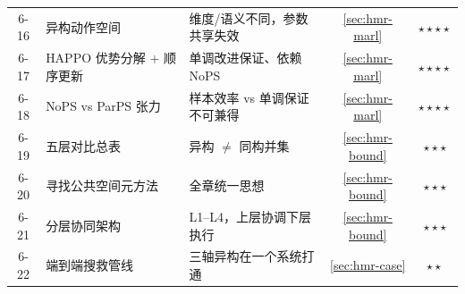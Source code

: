 \begin{table}[H]
\begin{tabular}{clp{5.4cm}cc}
6-16 & 异构动作空间 & 维度/语义不同，参数共享失效 & \cref{sec:hmr-marl} & $\star\star\star\star$ \\
6-17 & HAPPO 优势分解 $+$ 顺序更新 & 单调改进保证、依赖 NoPS & \cref{sec:hmr-marl} & $\star\star\star\star$ \\
6-18 & NoPS vs ParPS 张力 & 样本效率 vs 单调保证不可兼得 & \cref{sec:hmr-marl} & $\star\star\star\star$ \\
6-19 & 五层对比总表 & 异构 $\ne$ 同构并集 & \cref{sec:hmr-bound} & $\star\star\star$ \\
6-20 & 寻找公共空间元方法 & 全章统一思想 & \cref{sec:hmr-bound} & $\star\star\star$ \\
6-21 & 分层协同架构 & L1--L4，上层协调下层执行 & \cref{sec:hmr-bound} & $\star\star\star$ \\
6-22 & 端到端搜救管线 & 三轴异构在一个系统打通 & \cref{sec:hmr-case} & $\star\star$ \\
\bottomrule
\end{tabular}
\end{table}

